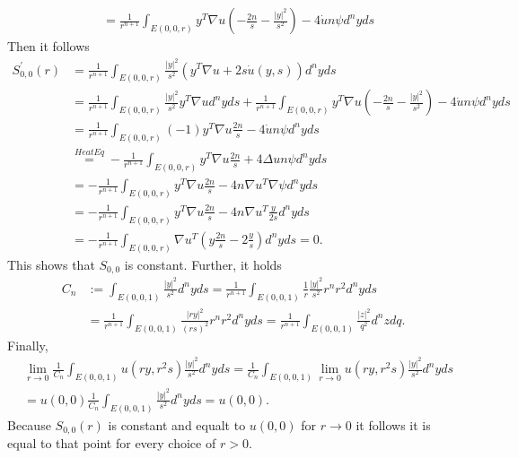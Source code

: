 \documentclass[A4,12pt,twoside]{book}
\begin{document}
{\begin{align*}
         &=   \frac{1}{r^{n+1}}  \int_{E(0,0,r)}   y^T \nabla u \left( -  \frac{2n}{ s} - \frac{|y|^2}{ s^{2}}  \right) - 4   \dot{u} n \psi  d^n y ds 
    \end{align*}
    Then it follows 
    \begin{align*}
        S^\prime_{0,0} (r)& = \frac{1}{r^{n+1}} \int_{E(0,0,r)}  \frac{|y|^2}{s^2} \left( y^T \nabla u + 2 s \dot{u}(y,s) \right) d^n y ds \\
        &= \frac{1}{r^{n+1}} \int_{E(0,0,r)}  \frac{|y|^2}{s^2} y^T \nabla u  d^n y ds + \frac{1}{r^{n+1}}  \int_{E(0,0,r)}   y^T \nabla u \left( -  \frac{2n}{ s} - \frac{|y|^2}{ s^{2}}  \right) - 4   \dot{u} n \psi  d^n y ds \\
        &=  \frac{1}{r^{n+1}}  \int_{E(0,0,r)}  (-1)  y^T \nabla u   \frac{2n}{ s} - 4   \dot{u} n \psi  d^n y ds \\
        &\stackrel{HeatEq}{=}  - \frac{1}{r^{n+1}}  \int_{E(0,0,r)}    y^T \nabla u   \frac{2n}{ s} + 4   \Delta u n \psi  d^n y ds \\
        &=  - \frac{1}{r^{n+1}}  \int_{E(0,0,r)}    y^T \nabla u   \frac{2n}{ s} - 4 n  \nabla u^T  \nabla \psi  d^n y ds \\
        &= - \frac{1}{r^{n+1}}  \int_{E(0,0,r)}    y^T \nabla u   \frac{2n}{ s} - 4 n  \nabla u^T  \frac{y}{2s}  d^n y ds \\
         &= - \frac{1}{r^{n+1}}  \int_{E(0,0,r)} \nabla u^T \left(    y  \frac{2n}{ s} -    2 \frac{y}{s} \right) d^n y ds  =0.
    \end{align*}
    This shows that $S_{0,0}$ is constant. Further, it holds 
    \begin{align*}
        C_n &:= \int_{E(0,0,1)} \frac{|y|^2}{s^2} d^n y ds = \frac{1}{r^{n+1}} \int_{E(0,0,1)} \frac{1}{r} \frac{|y|^2}{s^2} r^n r^2 d^n y ds\\
        &=\frac{1}{r^{n+1}} \int_{E(0,0,1)}  \frac{|ry|^2}{(rs)^2} r^n r^2 d^n y ds = \frac{1}{r^{n+1}} \int_{E(0,0,1)}  \frac{|z|^2}{q^2}  d^n z dq.
    \end{align*}
    Finally, 
    \begin{align*}
       &\lim_{r \to 0} \frac{1}{C_n} \int_{E(0,0,1)} u(ry,r^2 s) \frac{|y|^2}{s^2} d^n y ds = \frac{1}{C_n} \int_{E(0,0,1)} \lim_{r \to 0}  u(ry,r^2 s) \frac{|y|^2}{s^2} d^n y ds \\
        &=u(0,0) \frac{1}{C_n} \int_{E(0,0,1)} \frac{|y|^2}{s^2} d^n y ds= u(0,0).
    \end{align*}
    Because $S_{0,0}(r)$ is constant and equalt to $u(0,0)$ for $r \to 0$ it follows it is equal to that point for every choice of $r>0$.
    
}
\end{document}

